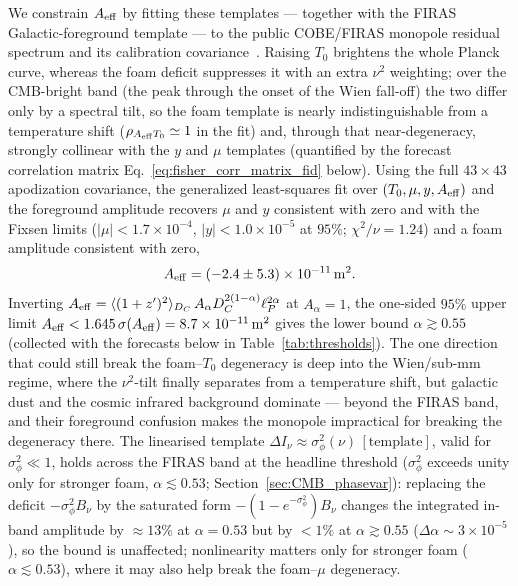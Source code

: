 \documentclass[aps,prd,onecolumn,amsmath,amssymb]{revtex4-2}
\begin{document}
We constrain $A_{\rm eff}$ by fitting these templates --- together with
the FIRAS Galactic-foreground template --- to the public COBE/FIRAS
monopole residual spectrum and its calibration
covariance~\cite{Fixsen1996}.  Raising $T_0$ brightens the whole Planck
curve, whereas the foam deficit suppresses it with an extra $\nu^2$
weighting; over the CMB-bright band (the peak through the onset of the
Wien fall-off) the two differ only by a spectral tilt, so the foam
template is nearly indistinguishable from a temperature shift
($\rho_{A_{\rm eff}T_0}\simeq 1$ in the fit) and, through that
near-degeneracy, strongly collinear with the $y$ and $\mu$ templates
(quantified by the forecast correlation matrix
Eq.~\eqref{eq:fisher_corr_matrix_fid} below).  Using the
full $43\times43$ apodization covariance, the generalized
least-squares fit over $(T_0,\mu,y,A_{\rm eff})$ and the foreground
amplitude recovers $\mu$ and $y$ consistent with zero and with the
Fixsen limits ($|\mu|<1.7\times10^{-4}$, $|y|<1.0\times10^{-5}$ at
$95\%$; $\chi^2/\nu=1.24$) and a foam amplitude consistent with zero,
\begin{equation}
  A_{\rm eff}=(-2.4\pm5.3)\times10^{-11}\,{\rm m}^2 .
  \label{eq:Aeff_firas}
\end{equation}
Inverting $A_{\rm eff}=\langle(1+z')^2\rangle_{D_C}\,A_\alpha D_C^{2(1-\alpha)}\ell_P^{2\alpha}$
at $A_\alpha=1$, the one-sided $95\%$ upper limit
$A_{\rm eff}<1.645\,\sigma(A_{\rm eff})=8.7\times10^{-11}\,{\rm m}^2$ gives the lower bound
$\alpha\gtrsim 0.55$ (collected with the forecasts below
in Table~\ref{tab:thresholds}).
The one direction that could still break the
foam--$T_0$ degeneracy is deep into the Wien/sub-mm regime, where the
$\nu^2$-tilt finally separates from a temperature shift, but galactic
dust and the cosmic infrared background dominate --- beyond the FIRAS
band, and their foreground confusion makes the monopole impractical for
breaking the degeneracy there.  The linearised template
$\Delta I_\nu\approx\sigma_\phi^2(\nu)\,[\text{template}]$, valid for
$\sigma_\phi^2\ll1$, holds across the FIRAS band at the headline
threshold ($\sigma_\phi^2$ exceeds unity only for stronger foam,
$\alpha\lesssim0.53$; Section~\ref{sec:CMB_phasevar}): replacing the
deficit $-\sigma_\phi^2 B_\nu$ by the saturated form
$-(1-e^{-\sigma_\phi^2})B_\nu$ changes the integrated in-band amplitude
by $\approx13\%$ at $\alpha=0.53$ but by $<1\%$ at $\alpha\gtrsim0.55$
($\Delta\alpha\sim3\times10^{-5}$), so the bound is unaffected;
nonlinearity matters only for stronger foam ($\alpha\lesssim0.53$),
where it may also help break the foam--$\mu$ degeneracy.
\end{document}
